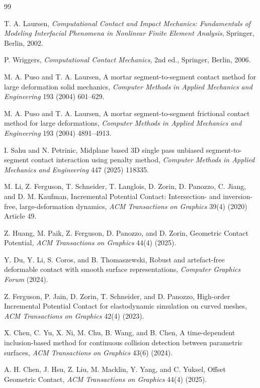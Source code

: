 \documentclass[preprint,12pt]{elsarticle}
\begin{document}
\begin{thebibliography}{99}

T. A. Laursen, \emph{Computational Contact and Impact Mechanics: Fundamentals of Modeling Interfacial Phenomena in Nonlinear Finite Element Analysis}, Springer, Berlin, 2002.

P. Wriggers, \emph{Computational Contact Mechanics}, 2nd ed., Springer, Berlin, 2006.

M. A. Puso and T. A. Laursen, A mortar segment-to-segment contact method for large deformation solid mechanics, \emph{Computer Methods in Applied Mechanics and Engineering} 193 (2004) 601--629.

M. A. Puso and T. A. Laursen, A mortar segment-to-segment frictional contact method for large deformations, \emph{Computer Methods in Applied Mechanics and Engineering} 193 (2004) 4891--4913.

I. Sahu and N. Petrinic, Midplane based 3D single pass unbiased segment-to-segment contact interaction using penalty method, \emph{Computer Methods in Applied Mechanics and Engineering} 447 (2025) 118335.

M. Li, Z. Ferguson, T. Schneider, T. Langlois, D. Zorin, D. Panozzo, C. Jiang, and D. M. Kaufman, Incremental Potential Contact: Intersection- and inversion-free, large-deformation dynamics, \emph{ACM Transactions on Graphics} 39(4) (2020) Article 49.

Z. Huang, M. Paik, Z. Ferguson, D. Panozzo, and D. Zorin, Geometric Contact Potential, \emph{ACM Transactions on Graphics} 44(4) (2025).

Y. Du, Y. Li, S. Coros, and B. Thomaszewski, Robust and artefact-free deformable contact with smooth surface representations, \emph{Computer Graphics Forum} (2024).

Z. Ferguson, P. Jain, D. Zorin, T. Schneider, and D. Panozzo, High-order Incremental Potential Contact for elastodynamic simulation on curved meshes, \emph{ACM Transactions on Graphics} 42(4) (2023).

X. Chen, C. Yu, X. Ni, M. Chu, B. Wang, and B. Chen, A time-dependent inclusion-based method for continuous collision detection between parametric surfaces, \emph{ACM Transactions on Graphics} 43(6) (2024).

A. H. Chen, J. Hsu, Z. Liu, M. Macklin, Y. Yang, and C. Yuksel, Offset Geometric Contact, \emph{ACM Transactions on Graphics} 44(4) (2025).


\end{thebibliography}
\end{document}
